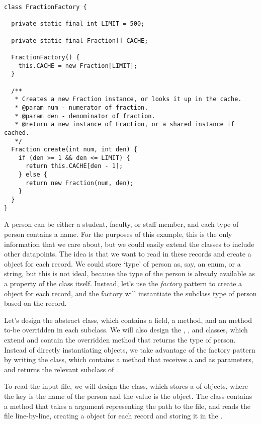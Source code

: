 \enlargethispage{-4\baselineskip}
\begin{lstlisting}[language=MyJava]
class FractionFactory {

  private static final int LIMIT = 500;
  
  private static final Fraction[] CACHE;

  FractionFactory() {
    this.CACHE = new Fraction[LIMIT];
  }

  /**
   * Creates a new Fraction instance, or looks it up in the cache.
   * @param num - numerator of fraction.
   * @param den - denominator of fraction.
   * @return a new instance of Fraction, or a shared instance if cached.
   */
  Fraction create(int num, int den) {
    if (den >= 1 && den <= LIMIT) {
      return this.CACHE[den - 1];
    } else {
      return new Fraction(num, den);
    }
  }
}
\end{lstlisting}

A person can be either a student, faculty, or staff member, and each type of person contains a name. 
For the purposes of this example, this is the only information that we care about, but we could easily extend the classes to include other datapoints. 
The idea is that we want to read in these records and create a  object for each record. 
We could store `type' of person as, say, an enum, or a string, but this is not ideal, because the type of the person is already available as a property of the class itself. 
Instead, let's use the \emph{factory} pattern to create a  object for each record, and the factory will instantiate the subclass type of person based on the record.

Let's design the abstract  class, which contains a  field, a  method, and an   method to-be overridden in each subclass. 
We will also design the , , and  classes, which extend  and contain the overridden  method that returns the type of person. 
Instead of directly instantiating  objects, we take advantage of the factory pattern by writing the  class, which contains a  method that receives a  and  as parameters, and returns the relevant subclass of .

To read the input file, we will design the  class, which stores a  of  objects, where the key is the name of the person and the value is the  object. 
The  class contains a  method that takes a  argument representing the path to the file, and reads the file line-by-line, creating a  object for each record and storing it in the .

